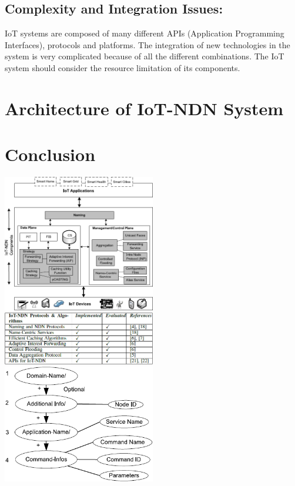 \documentclass[conference]{IEEEtran}
\begin{document}

\subsection{Complexity and Integration Issues:}
IoT systems are composed of many different APIs (Application Programming Interfaces), protocols and platforms. 
The integration of new technologies in the system is very complicated because of all the different combinations. The IoT system should consider the resource limitation of its components.




\section{Architecture of IoT-NDN System}
\section{Conclusion}

\includegraphics[width=0.5\textwidth]{IoT-NDN_System_architecture_and_its_components.png}\\
\includegraphics[width=0.5\textwidth]{IMPLEMENTED_AND_TESTED_PROTOCOLS_AND_ALGORITHMS_IN_IOT-NDN.png}\\
\includegraphics[width=0.5\textwidth]{Name_Structure_of_the_suggested_Approach.png}\\
\end{document}
